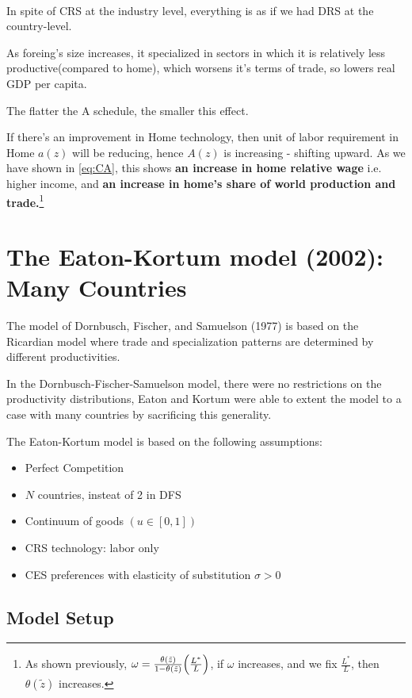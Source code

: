 \begin{note}
    \
    
    In spite of CRS at the industry level, everything is as if we had DRS at the country-level.

    As foreing's size increases, it specialized in sectors in which it is relatively less productive(compared to home),
    which worsens it's terms of trade, so lowers real GDP per capita.

    The flatter the A schedule, the smaller this effect.
\end{note}

If there's an improvement in Home technology, then unit of labor requirement in Home $a(z)$ will be reducing, hence $A(z)$ is increasing - shifting upward. 
As we have shown in \ref{eq:CA}, this shows \textbf{an increase in home relative wage} i.e. higher income, 
and \textbf{an increase in home's share of world production and trade.}\footnote{As shown previously, $\omega = \frac{\theta(\tilde{z})}{1-\theta(\tilde{z})} \Bigl(\frac{L^*}{L}\Bigr)$, 
if $\omega$ increases, and we fix $\frac{L^*}{L}$, then $\theta(\tilde{z})$ increases.} 

\section{The Eaton-Kortum model (2002): Many Countries\cite{eaton2002technology}}
The model of Dornbusch, Fischer, and Samuelson (1977)\cite{dornbusch1977comparative} is based on the Ricardian model
where trade and specialization patterns are determined by different productivities.

In the Dornbusch-Fischer-Samuelson model, there were no restrictions on the productivity distributions,
Eaton and Kortum were able to extent the model to a case with many countries by sacrificing this generality.

The Eaton-Kortum model is based on the following assumptions:
\begin{itemize}
    \item Perfect Competition
    \item $N$ countries, insteat of 2 in DFS
    \item Continuum of goods $(u \in [0,1])$
    \item CRS technology: labor only
    \item CES preferences with elasticity of substitution $\sigma > 0$
\end{itemize}

\subsection{Model Setup}

